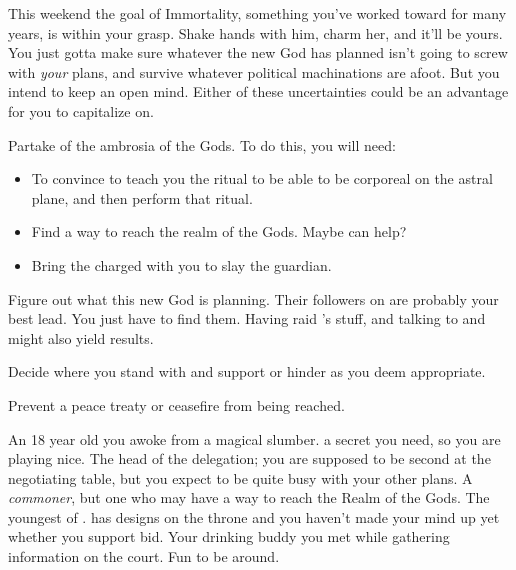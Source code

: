 \documentclass[char]{GL2020}
\begin{document}
This weekend the goal of Immortality, something you’ve worked toward for many years, is within your grasp. Shake hands with him, charm her, and it’ll be yours. You just gotta make sure whatever the new God has planned isn’t going to screw with \emph{your} plans, and survive whatever political machinations are afoot. But you intend to keep an open mind. Either of these uncertainties could be an advantage for you to capitalize on.


\begin{itemz}[Goals]
	\item Partake of the ambrosia of the Gods. To do this, you will need:
	\begin{itemize}
		\item To convince \cDisney{} to teach you the ritual to be able to be corporeal on the astral plane, and then perform that ritual.
		\item Find a way to reach the realm of the Gods. Maybe \cCurse{} can help?
		\item Bring the charged \iScythe{} with you to slay the guardian.
	\end{itemize}
	\item Figure out what this new God is planning. Their followers on \pEarth{} are probably your best lead. You just have to find them. Having \cDisney{} raid \cBunker{}’s stuff, and talking to \cHeadScientist{} and \cAssistantScientist{} might also yield results.
	\item Decide where you stand with \cPrince{} and support or hinder \cPrince{\them} as you deem appropriate.
	\item Prevent a peace treaty or ceasefire from being reached.
\end{itemz}

\begin{itemz}[Notes]
	\item <NEEDS NOTE FOR THE RN>
\end{itemz}

\begin{contacts}
	\contact{\cDisney{}} An 18 year old \cDisney{\child} you awoke from a magical slumber. \cDisney{\They} \cDisney{\have} a secret you need, so you are playing nice.
	\contact{\cEvil{}} The head of the \pFarm{} delegation; you are supposed to be \cEvil{\their} second at the negotiating table, but you expect to be quite busy with your other plans.
	\contact{\cCurse{}} A \emph{commoner}, but one who may have a way to reach the Realm of the Gods.
	\contact{\cPrince{}} The youngest \cPrince{\child} of \cQueen{\Majesty} \cQueen{}. \cPrince{} has designs on the throne and you haven’t made your mind up yet whether you support \cPrince{\their} bid.
	\contact{\cHedonist{}} Your \cHedonist{\cleric} drinking buddy you met while gathering information on the court. Fun to be around.
\end{contacts}
\end{document}
